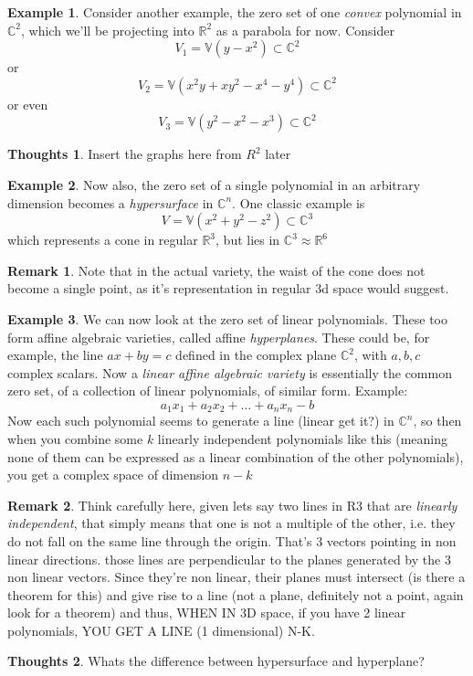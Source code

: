 \documentclass[12pt]{book}
\theoremstyle{definition}
\newtheorem{eg}{Example}[chapter]
\newtheorem*{huh}{Thoughts}
\newtheorem*{rem}{Remark}
\begin{document}
\begin{eg}
Consider another example, the zero set of one \textit{convex} polynomial in $\mathbb{C}^2$, which we'll be projecting into $\mathbb{R}^2$ as a parabola for now. Consider $$V_1 = \mathbb{V}(y - x^2) \subset \mathbb{C}^2$$ or 
$$V_2 = \mathbb{V}(x^2y + xy^2 - x^4 - y^4) \subset \mathbb{C}^2$$ or even
$$V_3 = \mathbb{V}(y^2 - x^2 - x^3) \subset \mathbb{C}^2$$
\begin{huh}
Insert the graphs here from $R^2$ later
\end{huh}
\end{eg}
\begin{eg}
Now also, the zero set of a single polynomial in an arbitrary dimension becomes a \textit{hypersurface} in $\mathbb{C}^n$. One classic example is $$V = \mathbb{V}(x^2 + y^2 - z^2) \subset \mathbb{C}^3$$ which represents a cone in regular $\mathbb{R}^3$, but lies in $\mathbb{C}^3 \approx \mathbb{R}^6$
\begin{rem}
Note that in the actual variety, the waist of the cone does not become a single point, as it's representation in regular 3d space would suggest.
\end{rem}
\end{eg}
\begin{eg}
We can now look at the zero set of linear polynomials. These too form affine algebraic varieties, called affine \textit{hyperplanes}. These could be, for example, the line $ax + by = c$ defined in the complex plane $\mathbb{C}^2$, with $a, b, c$ complex scalars.
Now a \textit{linear affine algebraic variety} is essentially the common zero set, of a collection of linear polynomials, of similar form. Example: $$a_1x_1 + a_2x_2 + \ldots + a_nx_n - b$$ Now each such polynomial seems to generate a line (linear get it?) in $\mathbb{C}^n$, so then when you combine some $k$ linearly independent polynomials like this (meaning none of them can be expressed as a linear combination of the other polynomials), you get a complex space of dimension $n-k$
\begin{rem}
Think carefully here, given lets say two lines in R3 that are \textit{linearly independent}, that simply means that one is not a multiple of the other, i.e. they do not fall on the same line through the origin. That's 3 vectors pointing in non linear directions. those lines are perpendicular to the planes generated by the 3 non linear vectors. Since they're non linear, their planes must intersect (is there a theorem for this) and give rise to a line (not a plane, definitely not a point, again look for a theorem) and thus, WHEN IN 3D space, if you have 2 linear polynomials, YOU GET A LINE (1 dimensional) N-K.
\end{rem}\begin{huh}
Whats the difference between hypersurface and hyperplane?
\end{huh}
\end{eg}
\end{document}
